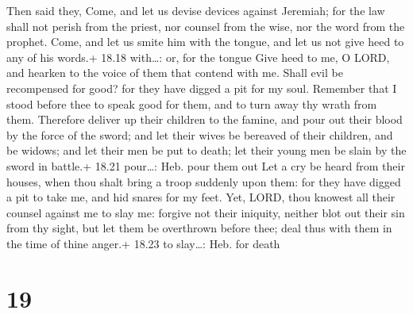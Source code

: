  Then said they, Come, and let us devise devices against
Jeremiah; for the law shall not perish from the priest, nor counsel from
the wise, nor the word from the prophet. Come, and let us smite him with
the tongue, and let us not give heed to any of his words.+ 18.18
with\ldots: or, for the tongue  Give heed to me, O LORD,
and hearken to the voice of them that contend with me. 
Shall evil be recompensed for good? for they have digged a pit for my
soul. Remember that I stood before thee to speak good for them, and to
turn away thy wrath from them.  Therefore deliver up their
children to the famine, and pour out their blood by the force of the
sword; and let their wives be bereaved of their children, and be widows;
and let their men be put to death; let their young men be slain by the
sword in battle.+ 18.21 pour\ldots: Heb. pour them out  Let
a cry be heard from their houses, when thou shalt bring a troop suddenly
upon them: for they have digged a pit to take me, and hid snares for my
feet.  Yet, LORD, thou knowest all their counsel against me
to slay me: forgive not their iniquity, neither blot out their sin from
thy sight, but let them be overthrown before thee; deal thus with them
in the time of thine anger.+ 18.23 to slay\ldots: Heb. for death

\hypertarget{section-18}{%
\section{19}\label{section-18}}

